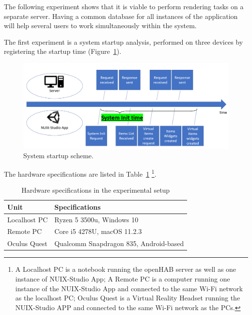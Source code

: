 The following experiment shows that it is viable to perform rendering tasks on a separate server. Having a common database for all instances of the application will help several users to work simultaneously within the system.

The first experiment is a system startup analysis, performed on three devices by registering the startup time (Figure~\ref{fig:SystemStartupScheme-figure}).

\begin{figure}
  \centering
  \includegraphics[width = 0.9 \linewidth]{figures/SystemStartupScheme.png}
  \caption{System startup scheme.}
  \label{fig:SystemStartupScheme-figure}
\end{figure}

The hardware specifications are listed in Table~\ref{tab:hardware-specifications-table} \footnote{A Localhost PC is a notebook running the openHAB server as well as one instance of NUIX-Studio App; A Remote PC is a computer running one instance of the NUIX-Studio App and connected to the same Wi-Fi network as the localhost PC; Oculus Quest is a Virtual Reality Headset running the NUIX-Studio APP and connected to the same Wi-Fi network as the PCs.}.

\begin{table}
  \centering
  \begin{threeparttable}[c]
    \caption{Hardware specifications in the experimental setup}
    \label{tab:hardware-specifications-table}
    \begin{tabular}{ll}
      \toprule
      Unit    &         Specifications                 \\
      \midrule
      Localhost PC & Ryzen 5 3500u, Windows 10 \\
      Remote PC & Core i5 4278U, macOS 11.2.3    \\
      Oculus Quest        & Qualcomm Snapdragon 835, Android-based            \\
      \bottomrule
    \end{tabular}
  \end{threeparttable}
\end{table}

